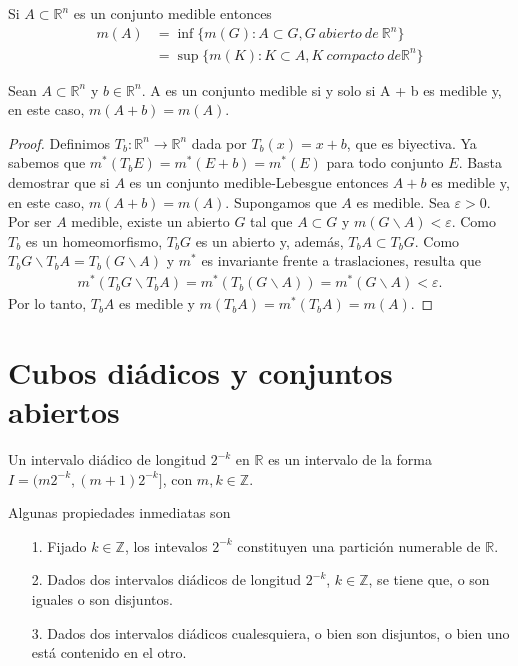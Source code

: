 \begin{teo}
Si $A \subset \mathbb{R}^n$ es un conjunto medible entonces
\begin{align*}
    m(A) &= \inf{\{ m(G) : A \subset G, G \ abierto \ de \ \mathbb{R}^n \}} \\
    &= \sup{\{ m(K) : K \subset A, K \ compacto \ de \mathbb{R}^n \}}
\end{align*}
\end{teo}

\begin{teo}
Sean $A \subset \mathbb{R}^n$ y $b \in \mathbb{R}^n$. A es un conjunto medible si y solo si A + b es medible y, en este caso, $m(A + b) = m(A)$.
\end{teo}

\begin{proof}
Definimos $T_b: \mathbb{R}^n \longrightarrow \mathbb{R}^n$ dada por $T_b(x) = x + b$, que es biyectiva. Ya sabemos que $m^*(T_bE) = m^*(E + b) = m^*(E)$ para todo conjunto $E$. Basta demostrar que si $A$ es un conjunto medible-Lebesgue entonces $A + b$ es medible y, en este caso, $m(A + b) = m(A)$. Supongamos que $A$ es medible. Sea $\varepsilon > 0$. Por ser $A$ medible, existe un abierto $G$ tal que $A \subset G$ y $m(G \backslash A) < \varepsilon$. Como $T_b$ es un homeomorfismo, $T_bG$ es un abierto y, además, $T_bA \subset T_bG$. Como $T_bG \backslash T_bA = T_b(G \backslash A)$ y $m^*$ es invariante frente a traslaciones, resulta que
\begin{align*}
    m^*(T_bG \backslash T_bA) = m^*(T_b(G \backslash A)) = m^*(G \backslash A) < \varepsilon.
\end{align*}
Por lo tanto, $T_bA$ es medible y $m(T_bA) = m^*(T_bA) = m(A)$.
\end{proof}

\section{Cubos diádicos y conjuntos abiertos}

\begin{defi}
Un intervalo diádico de longitud $2^{-k}$ en $\mathbb{R}$ es un intervalo de la forma $I = (m2^{-k}, (m+1)2^{-k}]$, con $m,k \in \mathbb{Z}$.
\end{defi}

\begin{obs}
Algunas propiedades inmediatas son
\begin{enumerate}
    \item[1.] Fijado $k \in \mathbb{Z}$, los intevalos $2^{-k}$ constituyen una partición numerable de $\mathbb{R}$.
    \item[2.] Dados dos intervalos diádicos de longitud $2^{-k}$, $k \in \mathbb{Z}$, se tiene que, o son iguales o son disjuntos.
    \item[3.] Dados dos intervalos diádicos cualesquiera, o bien son disjuntos, o bien uno está contenido en el otro.
\end{enumerate}
\end{obs}

